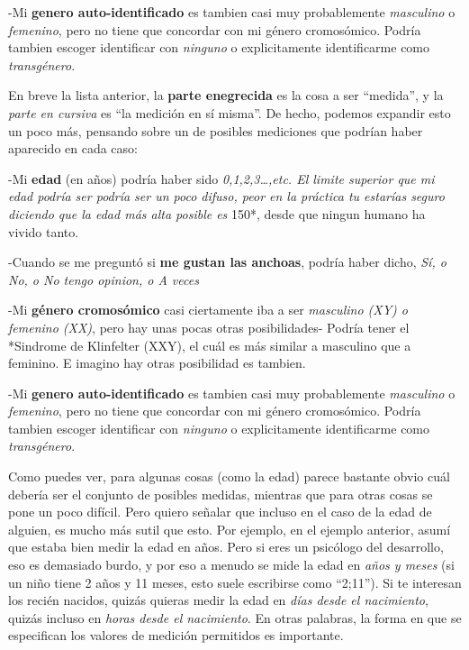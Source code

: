 \documentclass[]{book}
\begin{document}
-Mi \textbf{genero auto-identificado} es tambien casi muy probablemente \emph{masculino} o \emph{femenino}, pero no tiene que concordar con mi género cromosómico.
Podría tambien escoger identificar con \emph{ninguno} o explicitamente identificarme como \emph{transgénero}.

En breve la lista anterior, la \textbf{parte enegrecida} es la cosa a ser ``medida'', y la \emph{parte en cursiva} es ``la medición en sí misma''. De hecho,
podemos expandir esto un poco más, pensando sobre un de posibles mediciones que podrían haber aparecido en cada caso:

-Mi \textbf{edad} (en años) podría haber sido \emph{0,1,2,3\ldots{},etc. El limite superior que mi edad podría ser podría ser un poco difuso, peor en la práctica
tu estarías seguro diciendo que la edad más alta posible es }150*, desde que ningun humano ha vivido tanto.

-Cuando se me preguntó si \textbf{me gustan las anchoas}, podría haber dicho, \emph{Sí, o No, o No tengo opinion, o A veces}

-Mi \textbf{género cromosómico} casi ciertamente iba a ser \emph{masculino (XY) o femenino (XX)}, pero hay unas pocas otras posibilidades- Podría tener el *Sindrome de
Klinfelter (XXY), el cuál es más similar a masculino que a feminino. E imagino hay otras posibilidad es tambien.

-Mi \textbf{genero auto-identificado} es tambien casi muy probablemente \emph{masculino} o \emph{femenino}, pero no tiene que concordar con mi género cromosómico.
Podría tambien escoger identificar con \emph{ninguno} o explicitamente identificarme como \emph{transgénero}.

Como puedes ver, para algunas cosas (como la edad) parece bastante obvio cuál debería ser el conjunto de posibles medidas, mientras que para otras cosas se pone un poco difícil. Pero quiero señalar que incluso en el caso de la edad de alguien, es mucho más sutil que esto. Por ejemplo, en el ejemplo anterior, asumí que estaba bien medir la edad en años. Pero si eres un psicólogo del desarrollo, eso es demasiado burdo, y por eso a menudo se mide la edad en \emph{años y meses} (si un niño tiene 2 años y 11 meses, esto suele escribirse como ``2;11''). Si te interesan los recién nacidos, quizás quieras medir la edad en \emph{días desde el nacimiento}, quizás incluso en \emph{horas desde el nacimiento}. En otras palabras, la forma en que se especifican los valores de medición permitidos es importante.
\end{document}
